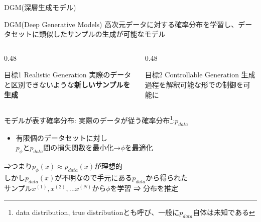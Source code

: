 \begin{frame}{DGM(深層生成モデル)}
\begin{block}{DGM(Deep Generative Models)}
高次元データに対する確率分布を学習し、データセットに類似したサンプルの生成が可能なモデル\\
\end{block}

\vspace{-1em}

\begin{columns}[T]
\begin{column}{0.48\textwidth}
\begin{exampleblock}{\small 目標1 Realistic Generation}
\small 実際のデータと区別できないような\textbf{新しいサンプルを生成}
\end{exampleblock}
\end{column}

\begin{column}{0.48\textwidth}
\begin{exampleblock}{\small 目標2 Controllable Generation}
\small 生成過程を解釈可能な形での制御を可能に
\end{exampleblock}
\end{column}
\end{columns}

\vspace{1em}

\small モデルが表す確率分布:  実際のデータが従う確率分布\footnote{data distribution, true distributionとも呼び、一般に$p_{data}$自体は未知である}:$p_{data}$\unboldmath\\

\begin{itemize}
\item 有限個のデータセットに対し\\
$p_{\phi}$と$p_{data}$間の損失関数を最小化→${\phi}$を最適化
\end{itemize}

\begin{exampleblock}{}
⇒つまり$p_{\phi}(x)\approx p_{data}(x)$が理想的\\
しかし$p_{data}(x)$が不明なので手元にある$p_{data}$から得られた\\サンプル$x^{(1)},x^{(2)},...x^{(N)}$から$\phi$を学習 ⇒ 分布を推定
\end{exampleblock}
\end{frame}
